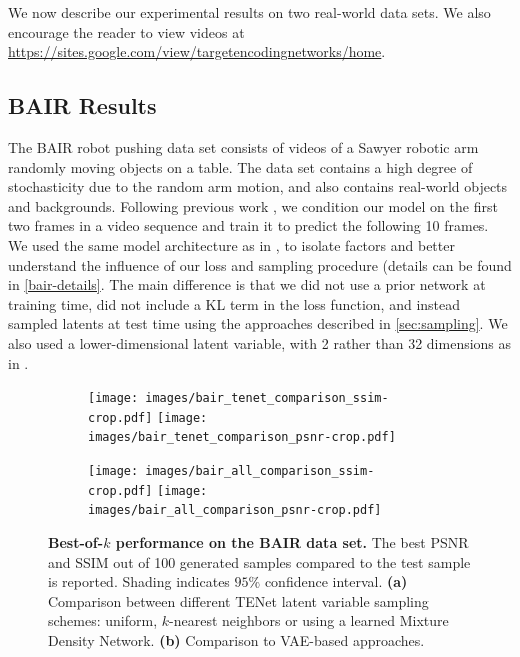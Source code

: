 \documentclass{article}
\begin{document}
We now describe our experimental results on two real-world data sets.
We also encourage the reader to view videos at \url{https://sites.google.com/view/targetencodingnetworks/home}.

\subsection{BAIR Results}

The BAIR robot pushing data set \citep{Ebert17} consists of videos of a Sawyer robotic arm randomly moving objects on a table.
The data set contains a high degree of stochasticity due to the random arm motion, and also contains real-world objects and backgrounds.
Following previous work \citep{Babaeizadeh2018, Denton2018}, we condition our model on the first two frames in a video sequence and train it to predict the following 10 frames.
We used the same model architecture as in \citep{Denton2018}, to isolate factors and better understand the influence of our loss and sampling procedure (details can be found in \cref{bair-details}.
The main difference is that we did not use a prior network at training time, did not include a KL term in the loss function, and instead sampled latents at test time using the approaches described in \cref{sec:sampling}.
We also used a lower-dimensional latent variable, with 2 rather than 32 dimensions as in \citep{Denton2018}.

\begin{figure}
  \centering
  \begin{subfigure}[b]{0.49 \textwidth}
    \texttt{[image: images/bair\_tenet\_comparison\_ssim-crop.pdf]}
    \texttt{[image: images/bair\_tenet\_comparison\_psnr-crop.pdf]}
    \caption{}
  \end{subfigure}
  \begin{subfigure}[b]{0.49 \textwidth}
    \texttt{[image: images/bair\_all\_comparison\_ssim-crop.pdf]}
    \texttt{[image: images/bair\_all\_comparison\_psnr-crop.pdf]}
    \caption{}
  \end{subfigure}
  \caption{
    \textbf{Best-of-$k$ performance on the BAIR data set.}
    The best PSNR and SSIM out of 100 generated samples compared to the test sample is reported.
    Shading indicates $95\%$ confidence interval.
    \textbf{(a)} Comparison between different TENet latent variable sampling schemes: uniform, $k$-nearest neighbors or using a learned Mixture Density Network.
    \textbf{(b)} Comparison to VAE-based approaches.
  }
  \label{bair}
\end{figure}
\end{document}
